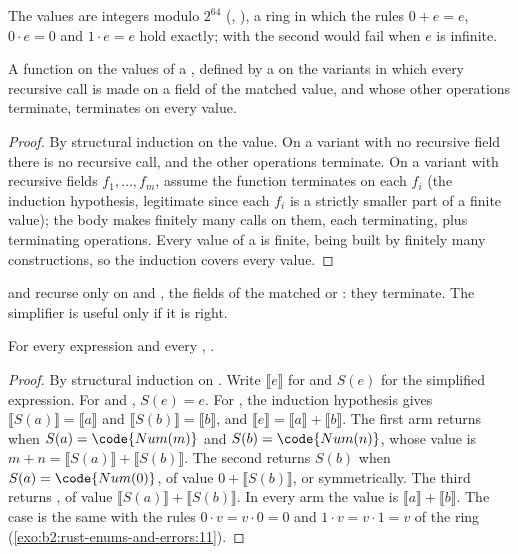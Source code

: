 The values are integers modulo $2^{64}$ (, ), a ring in which the rules
$0 + e = e$, $0 \cdot e = 0$ and $1 \cdot e = e$ hold exactly; with  the second would fail when $e$ is
infinite.

\begin{proposition}\label{prop:b2:rust-enums-and-errors:structural}
A function on the values of a , defined by a  on the variants in which every recursive call
is made on a field of the matched value, and whose other operations terminate, terminates on every value.
\end{proposition}

\begin{proof}
By structural induction on the value. On a variant with no recursive field there is no recursive call, and the other
operations terminate. On a variant with recursive fields $f_1, \dots, f_m$, assume the function terminates on each
$f_i$ (the induction hypothesis, legitimate since each $f_i$ is a strictly smaller part of a finite value); the body
makes finitely many calls on them, each terminating, plus terminating operations. Every value of a  is
finite, being built by finitely many constructions, so the induction covers every value.
\end{proof}

 and  recurse only on  and , the fields of the matched  or
: they terminate. The simplifier is useful only if it is right.

\begin{theorem}\label{thm:b2:rust-enums-and-errors:simplify}
For every expression  and every , .
\end{theorem}

\begin{proof}
By structural induction on . Write $\llbracket e \rrbracket$ for  and $S(e)$ for the
simplified expression. For  and , $S(e) = e$. For , the induction hypothesis gives
$\llbracket S(a) \rrbracket = \llbracket a \rrbracket$ and $\llbracket S(b) \rrbracket = \llbracket b \rrbracket$,
and $\llbracket e \rrbracket = \llbracket a \rrbracket + \llbracket b \rrbracket$. The first arm returns
 when $S(a) = \code{Num(m)}$ and $S(b) = \code{Num(n)}$, whose value is $m + n = \llbracket S(a)
\rrbracket + \llbracket S(b) \rrbracket$. The second returns $S(b)$ when $S(a) = \code{Num(0)}$, of value $0 +
\llbracket S(b) \rrbracket$, or symmetrically. The third returns , of value $\llbracket S(a)
\rrbracket + \llbracket S(b) \rrbracket$. In every arm the value is $\llbracket a \rrbracket + \llbracket b
\rrbracket$. The  case is the same with the rules $0 \cdot v = v \cdot 0 = 0$ and $1 \cdot v = v \cdot 1 = v$
of the ring (\cref{exo:b2:rust-enums-and-errors:11}).
\end{proof}

